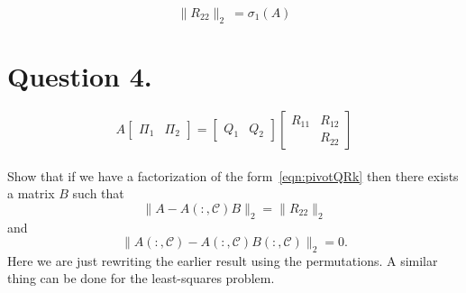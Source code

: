 \documentclass[12pt]{article}
\newcommand{\C}{\mathcal{C}}
\begin{document}
$$\|R_{22}\|_2\ = \sigma_1(A)$$

\section*{Question 4.}
\begin{equation}
    \label{eqn:pivotQRk}
    A\begin{bmatrix}\Pi_1 & \Pi_2\end{bmatrix} = \begin{bmatrix} Q_1 & Q_2\end{bmatrix} \begin{bmatrix} R_{11} & R_{12} \\ & R_{22}\end{bmatrix}
\end{equation} \\

Show that if we have a factorization of the form~\cref{eqn:pivotQRk} then there exists a matrix $B$ such that
\[
    \|A - A(:,\C)B\|_2 = \|R_{22}\|_2
\]
and
\[
    \|A(:,\C) - A(:,\C)B(:,\C)\|_2 = 0.
\]
Here we are just rewriting the earlier result using the permutations. A similar thing can be done for the least-squares problem. 
\end{document}
